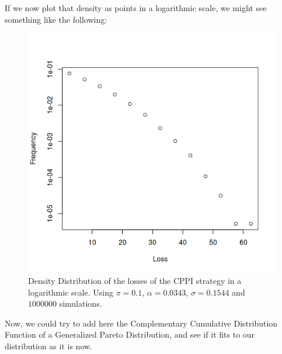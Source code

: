 If we now plot that density as points in a logarithmic scale, we might see something like the following:

\begin{figure}[h]
    \centering
    \includegraphics[scale=0.75]{images/cppi-dens-points.png}
    \caption{Density Distribution of the losses of the CPPI strategy in a logarithmic scale. Using $\pi = 0.1$, $\alpha = 0.0343$, $\sigma = 0.1544$ and $1000000$ simulations.}
    \label{fig:cppi-dens-points}
\end{figure}

Now, we could try to add here the Complementary Cumulative Distribution Function of a Generalized Pareto Distribution, and see if it fits to our distribution as it is now.

